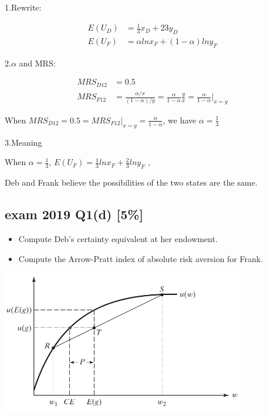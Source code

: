 \documentclass{article}
\begin{document}
1.Rewrite:

\begin{align*}
E(U_D) &= \frac{1}{3}x_D + {2}{3}y_D \\
E(U_F) &= \alpha ln x_F +  ({1-\alpha}) ln y_F 
\end{align*}

2.$\alpha$ and MRS:

\begin{align*}
MRS_{D12} &= 0.5 \\
MRS_{F12} &= \frac{\alpha / x}{({1-\alpha})/ y} = \frac{\alpha}{1-\alpha} \frac{y}{x} =  \frac{\alpha}{1-\alpha} \bigg\vert_{x=y}
\end{align*}

When $MRS_{D12} = 0.5 = MRS_{F12}\bigg\vert_{x=y} = \frac{\alpha}{1-\alpha}$, we have $\alpha = \frac{1}{3}$

3.Meaning

When $\alpha = \frac{1}{3}$, $E(U_F) =\frac{1}{3} ln x_F +  \frac{2}{3} ln y_F$ ,

Deb and Frank believe the possibilities of the two states are the same.

\subsection{exam 2019 Q1(d) [5\%] }

\begin{itemize}
\item Compute Deb's certainty equivalent at her endowment. 
\item Compute the Arrow-Pratt index of absolute risk aversion for Frank.
\end{itemize}

\begin{mdframed}[backgroundcolor=blue!20,linecolor=white]
\vspace{2mm}
{\centering
\includegraphics[width=0.8\textwidth]{4.cereq}
\label{cf}}
\vspace{2mm}
\end{mdframed}
\end{document}
